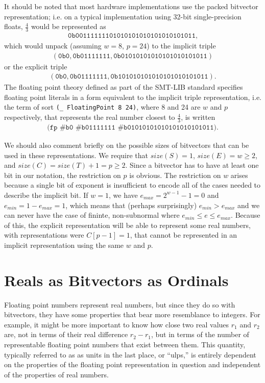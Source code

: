\documentclass[letterpaper,10pt]{article}
\begin{document}
It should be noted that most hardware implementations use the packed bitvector representation; i.e. on a typical implementation using 32-bit single-precision floats, $\frac{4}{3}$ would be represented as 
\begin{align*}
 \texttt{0b00111111101010101010101010101011} \text{,}
\end{align*}
which would unpack (assuming $w=8$, $p=24$) to the implicit triple 
\begin{align*}
 (\texttt{0b0}, \texttt{0b01111111}, \texttt{0b01010101010101010101011})
\end{align*}
or the explicit triple 
\begin{align*}
 (\texttt{0b0}, \texttt{0b01111111}, \texttt{0b101010101010101010101011}) \text{.}
\end{align*}
The floating point theory defined as part of the SMT-LIB standard specifies floating point literals in a form equivalent to the implicit triple representation, i.e. the term of sort \texttt{(\_ FloatingPoint 8 24)}, where 8 and 24 are $w$ and $p$ respectively, that represents the real number closest to $\frac{4}{3}$, is written 
\begin{align*}
 \texttt{(fp \#b0 \#b01111111 \#b01010101010101010101011)} \text{.}
\end{align*}

We should also comment briefly on the possible sizes of bitvectors that can be used in these representations. We require that $size(S) = 1$, $size(E) = w \geq 2$, and $size(C) = size(T) + 1 = p \geq 2$. Since a bitvector has to have at least one bit in our notation, the restriction on $p$ is obvious. The restriction on $w$ arises because a single bit of exponent is insufficient to encode all of the cases needed to describe the implicit bit. If $w = 1$, we have $e_{max} = 2^{w-1} - 1 = 0$ and $e_{min} = 1 - e_{max} = 1$, which means that (perhaps surprisingly) $e_{min} > e_{max}$ and we can never have the case of fininte, non-subnormal where $e_{min} \leq e \leq e_{max}$. Because of this, the explicit representation will be able to represent some real numbers, with representations were $C[p-1] = 1$, that cannot be represented in an implicit representation using the same $w$ and $p$. 

\section{Reals as Bitvectors as Ordinals}

Floating point numbers represent real numbers, but since they do so with bitvectors, they have some properties that bear more resemblance to integers. For example, it might be more important to know how close two real values $r_1$ and $r_2$ are, not in terms of their real difference $r_2 - r_1$, but in terms of the number of representable floating point numbers that exist between them. This quantity, typically referred to as as units in the last place, or ``ulps,'' is entirely dependent on the properties of the floating point representation in question and independent of the properties of real numbers.
\end{document}
